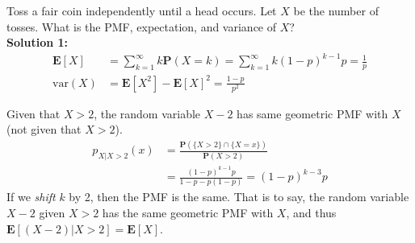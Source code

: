 \begin{example}
    Toss a fair coin independently until a head occurs. Let $X$ be the number of tosses. What is the PMF, expectation, and variance of $X$? \\ 
    \textbf{Solution 1:} 
    \begin{equation}
    \begin{aligned}
        \mathbf{E}[X] &= \sum_{k=1}^{\infty} k \mathbf{P}(X = k) = \sum_{k=1}^{\infty} k (1-p)^{k-1} p = \frac{1}{p} \\ 
        \text{var}(X) &= \mathbf{E}[X^{2}] - \mathbf{E}[X]^{2} = \frac{1-p}{p^{2}}
    \end{aligned}
    \end{equation}
\end{example}
\begin{property}
    Given that $X > 2$, the random variable $X - 2$ has same geometric PMF with $X$ (not given that $X > 2$). 
    \begin{equation}
    \begin{aligned}
        p_{X|X > 2}(x) &= \frac{\mathbf{P}(\{X > 2\} \cap \{X = x\})}{\mathbf{P}(X > 2)} \\ 
        &= \frac{(1 - p)^{k-1}p}{1 - p - p(1-p)} = (1-p)^{k-3}p
    \end{aligned}
    \end{equation}
    If we \textit{shift} $k$ by 2, then the PMF is the same. That is to say, the random variable $X - 2$ given $X > 2$ has the same geometric PMF with $X$, and thus $\mathbf{E}[(X - 2)|X > 2] = \mathbf{E}[X]$.
\end{property}
